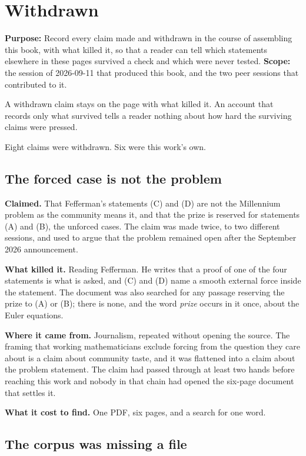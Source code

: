 \chapter{Withdrawn}

\textbf{Purpose:} Record every claim made and withdrawn in the course of assembling this book,
with what killed it, so that a reader can tell which statements elsewhere in these pages survived a
check and which were never tested. \textbf{Scope:} the session of 2026-09-11 that produced this
book, and the two peer sessions that contributed to it.

A withdrawn claim stays on the page with what killed it. An account that records only what survived
tells a reader nothing about how hard the surviving claims were pressed.

Eight claims were withdrawn. Six were this work's own.

\section{The forced case is not the problem}

\textbf{Claimed.} That Fefferman's statements (C) and (D) are not the Millennium problem as the
community means it, and that the prize is reserved for statements (A) and (B), the unforced cases.
The claim was made twice, to two different sessions, and used to argue that the problem remained
open after the September 2026 announcement.

\textbf{What killed it.} Reading Fefferman. He writes that a proof of one of the four statements is
what is asked, and (C) and (D) name a smooth external force inside the statement. The document was
also searched for any passage reserving the prize to (A) or (B); there is none, and the word
\emph{prize} occurs in it once, about the Euler equations.

\textbf{Where it came from.} Journalism, repeated without opening the source. The framing that
working mathematicians exclude forcing from the question they care about is a claim about community
taste, and it was flattened into a claim about the problem statement. The claim had passed through
at least two hands before reaching this work and nobody in that chain had opened the six-page
document that settles it.

\textbf{What it cost to find.} One PDF, six pages, and a search for one word.

\section{The corpus was missing a file}

